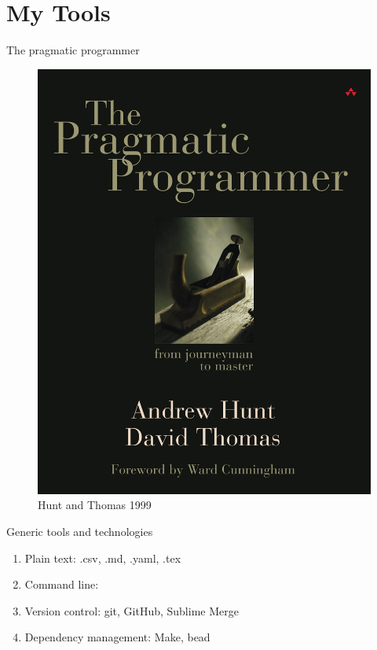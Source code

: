 \documentclass[
  ignorenonframetext,
  aspectratio=54,
]{beamer}
\providecommand{\tightlist}{%
  \setlength{\itemsep}{0pt}\setlength{\parskip}{0pt}}
\begin{document}
\hypertarget{my-tools}{%
\section{My Tools}\label{my-tools}}

\begin{frame}{The pragmatic programmer}
\protect\hypertarget{the-pragmatic-programmer}{}
\begin{figure}
\centering
\includegraphics{assets/img/pragmatic.jpg}
\caption{Hunt and Thomas 1999}
\end{figure}
\end{frame}

\begin{frame}{Generic tools and technologies}
\protect\hypertarget{generic-tools-and-technologies}{}
\begin{enumerate}
\tightlist
\item
  Plain text: .csv, .md, .yaml, .tex
\item
  Command line:
\item
  Version control: git, GitHub, Sublime Merge
\item
  Dependency management: Make, bead
\end{enumerate}
\end{frame}
\end{document}
